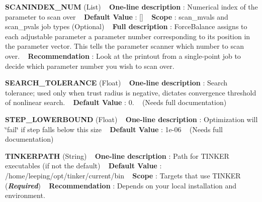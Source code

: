 \begin{DoxyItemize}
\item {\bfseries  S\+C\+A\+N\+I\+N\+D\+E\+X\+\_\+\+N\+UM } (List) ~\newline
{\bfseries  One-\/line description }\+: Numerical index of the parameter to scan over ~\newline
{\bfseries  Default Value }\+: \mbox{[}\mbox{]} ~\newline
{\bfseries  Scope }\+: scan\+\_\+mvals and scan\+\_\+pvals job types (Optional) ~\newline
{\bfseries  Full description }\+: Force\+Balance assigns to each adjustable parameter a \textquotesingle{}parameter number\textquotesingle{} corresponding to its position in the parameter vector. This tells the parameter scanner which number to scan over. ~\newline
{\bfseries  Recommendation }\+: Look at the printout from a single-\/point job to decide which parameter number you wish to scan over.\end{DoxyItemize}
\begin{DoxyItemize}
\item {\bfseries  S\+E\+A\+R\+C\+H\+\_\+\+T\+O\+L\+E\+R\+A\+N\+CE } (Float) ~\newline
{\bfseries  One-\/line description }\+: Search tolerance; used only when trust radius is negative, dictates convergence threshold of nonlinear search. ~\newline
{\bfseries  Default Value }\+: 0. ~\newline
(Needs full documentation)\end{DoxyItemize}
\begin{DoxyItemize}
\item {\bfseries  S\+T\+E\+P\+\_\+\+L\+O\+W\+E\+R\+B\+O\+U\+ND } (Float) ~\newline
{\bfseries  One-\/line description }\+: Optimization will \char`\"{}fail\char`\"{} if step falls below this size ~\newline
{\bfseries  Default Value }\+: 1e-\/06 ~\newline
(Needs full documentation)\end{DoxyItemize}
\begin{DoxyItemize}
\item {\bfseries  T\+I\+N\+K\+E\+R\+P\+A\+TH } (String) ~\newline
{\bfseries  One-\/line description }\+: Path for T\+I\+N\+K\+ER executables (if not the default) ~\newline
{\bfseries  Default Value }\+: /home/leeping/opt/tinker/current/bin ~\newline
{\bfseries  Scope }\+: Targets that use T\+I\+N\+K\+ER ({\bfseries {\itshape Required}}) ~\newline
{\bfseries  Recommendation }\+: Depends on your local installation and environment.\end{DoxyItemize}
